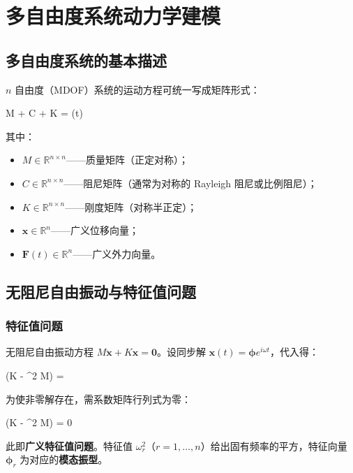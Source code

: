 \chapter{多自由度系统动力学建模}


\section{多自由度系统的基本描述}

$n$ 自由度（MDOF）系统的运动方程可统一写成矩阵形式：
\begin{myformula}
	M  + C  + K  = (t)
\end{myformula}
其中：
\begin{itemize}
	\item $M \in \mathbb{R}^{n \times n}$——质量矩阵（正定对称）；
	\item $C \in \mathbb{R}^{n \times n}$——阻尼矩阵（通常为对称的 Rayleigh 阻尼或比例阻尼）；
	\item $K \in \mathbb{R}^{n \times n}$——刚度矩阵（对称半正定）；
	\item $\mathbf{x} \in \mathbb{R}^n$——广义位移向量；
	\item $\mathbf{F}(t) \in \mathbb{R}^n$——广义外力向量。
\end{itemize}

\section{无阻尼自由振动与特征值问题}

\subsection{特征值问题}

无阻尼自由振动方程 $M \ddot{\mathbf{x}} + K \mathbf{x} = \mathbf{0}$。设同步解 $\mathbf{x}(t) = \boldsymbol{\phi} e^{i \omega t}$，代入得：
\begin{myformula}
	(K - \omega^2 M) \boldsymbol{\phi} = 
\end{myformula}

为使非零解存在，需系数矩阵行列式为零：
\begin{myformula}
	\det(K - \omega^2 M) = 0
\end{myformula}
此即\textbf{广义特征值问题}。特征值 $\omega_r^2$（$r = 1, \ldots, n$）给出固有频率的平方，特征向量 $\boldsymbol{\phi}_r$ 为对应的\textbf{模态振型}。

